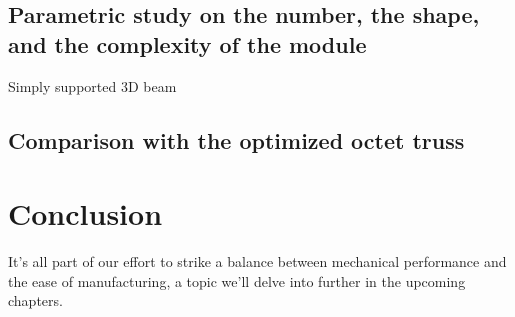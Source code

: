 \subsection{Parametric study on the number, the shape, and the complexity of the module}



Simply supported 3D beam

\subsection{Comparison with the optimized octet truss}


\section{Conclusion}
It's all part of our effort to strike a balance between mechanical performance and the ease of manufacturing, a topic we'll delve into further in the upcoming chapters.